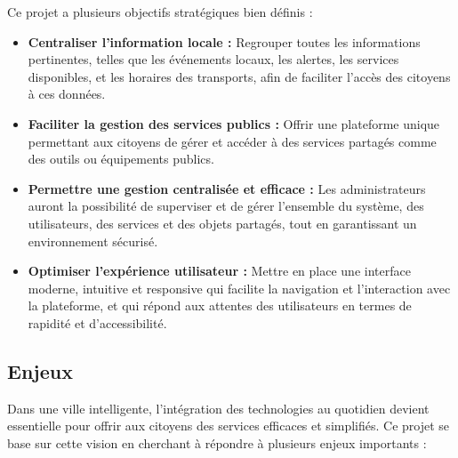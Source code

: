\documentclass[a4paper,12pt]{report}
\begin{document}
	Ce projet a plusieurs objectifs stratégiques bien définis :
	
	\begin{itemize}
		\item \textbf{Centraliser l'information locale :} Regrouper toutes les informations pertinentes, telles que les événements locaux, les alertes, les services disponibles, et les horaires des transports, afin de faciliter l’accès des citoyens à ces données.
		\item \textbf{Faciliter la gestion des services publics :} Offrir une plateforme unique permettant aux citoyens de gérer et accéder à des services partagés comme des outils ou équipements publics.
		\item \textbf{Permettre une gestion centralisée et efficace :} Les administrateurs auront la possibilité de superviser et de gérer l’ensemble du système, des utilisateurs, des services et des objets partagés, tout en garantissant un environnement sécurisé.
		\item \textbf{Optimiser l'expérience utilisateur :} Mettre en place une interface moderne, intuitive et responsive qui facilite la navigation et l’interaction avec la plateforme, et qui répond aux attentes des utilisateurs en termes de rapidité et d’accessibilité.
	\end{itemize}
	
	\subsection{Enjeux}
	
	Dans une ville intelligente, l'intégration des technologies au quotidien devient essentielle pour offrir aux citoyens des services efficaces et simplifiés. Ce projet se base sur cette vision en cherchant à répondre à plusieurs enjeux importants :
	
\end{document}
